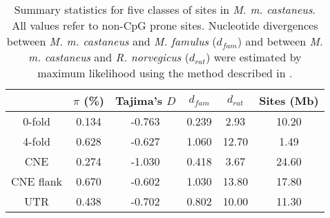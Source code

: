 \begin{table}[H]
\centering
\caption[Summary statistics for multiple classes of sites]{Summary statistics for five classes of sites in \textit{M. m. castaneus}. All values refer to non-CpG prone sites. Nucleotide divergences between \textit{M. m. castaneus} and \textit{M. famulus} ($d_{fam}$) and between \textit{M. m. castaneus} and \textit{R. norvegicus} ($d_{rat}$) were estimated by maximum likelihood using the method described in \cite{RN321}. }
\begin{tabular}{cccccc}
\toprule
           &  $\pi$ (\%)  &  Tajima's $D$ &  $d_{fam}$  &  $d_{rat}$  &  Sites (Mb) \\
\midrule
    0-fold &    0.134 &     -0.763 &   0.239 &    2.93 &       10.20 \\
    4-fold &    0.628 &     -0.627 &   1.060 &   12.70 &        1.49 \\
       CNE &    0.274 &     -1.030 &   0.418 &    3.67 &       24.60 \\
 CNE flank &    0.670 &     -0.602 &   1.030 &   13.80 &       17.80 \\
       UTR &    0.438 &     -0.702 &   0.802 &   10.00 &       11.30 \\
\bottomrule
\end{tabular}
\label{tab:CastSummaryStats}
\end{table}